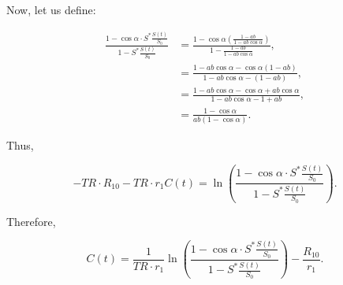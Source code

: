 Now, let us define:

\begin{align}
  \frac{1 - \cos \alpha \cdot S^{*}\frac{S(t)}{S_0}}{1 - S^{*}\frac{S(t)}{S_0}} &= \frac{ 1 - \cos \alpha\left(\frac{1 - a b}{1 - a b \cos \alpha}\right)} {1 - \frac{1 - a b}{1 - a b \cos \alpha}} , \\
  &= \frac{1 - a b \cos \alpha - \cos \alpha(1 - a b)}{1 - a b \cos \alpha - (1 - a b)} , \\
  &= \frac{1 - a b \cos \alpha - \cos \alpha + a b \cos \alpha}{1 - a b \cos \alpha - 1 + a b} , \\
  &= \frac{1 - \cos \alpha}{ ab (1 - \cos \alpha)} .
\end{align}

Thus,

\begin{equation}
  -TR \cdot R_{10} -TR \cdot r_1 C(t) = \ln\left( \frac{1 - \cos \alpha \cdot S^{*}\frac{S(t)}{S_0}}{1 - S^{*}\frac{S(t)}{S_0}} \right) .
\end{equation}

Therefore,

\begin{equation}
  C(t) = \frac{1}{TR \cdot r_1} \ln\left( \frac{1 - \cos \alpha \cdot S^{*}\frac{S(t)}{S_0}}{1 - S^{*}\frac{S(t)}{S_0}} \right) - \frac{R_{10}}{r_1} .
\end{equation}


